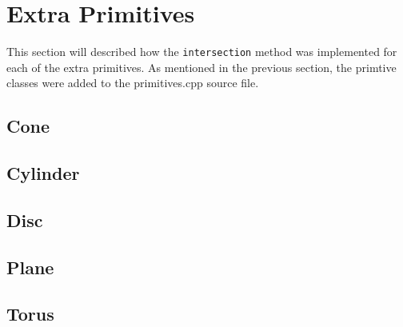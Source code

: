 \section{Extra Primitives}

This section will described how the \verb|intersection| method was
implemented for each of the extra primitives. As mentioned in the previous
section, the primtive classes were added to the primitives.cpp source file.

\subsection*{Cone}
\subsection*{Cylinder}
\subsection*{Disc}
\subsection*{Plane}
\subsection*{Torus}

